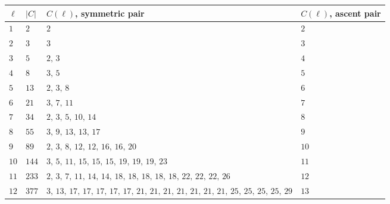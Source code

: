 \begin{tabular}{llll}
\toprule
$\ell$ & $|C|$ & $C(\ell)$, symmetric pair & $C(\ell)$, ascent pair \\
\midrule
$1$ & $2$ & $2$ & $2$ \\
$2$ & $3$ & $3$ & $3$ \\
$3$ & $5$ & $2,\,3$ & $4$ \\
$4$ & $8$ & $3,\,5$ & $5$ \\
$5$ & $13$ & $2,\,3,\,8$ & $6$ \\
$6$ & $21$ & $3,\,7,\,11$ & $7$ \\
$7$ & $34$ & $2,\,3,\,5,\,10,\,14$ & $8$ \\
$8$ & $55$ & $3,\,9,\,13,\,13,\,17$ & $9$ \\
$9$ & $89$ & $2,\,3,\,8,\,12,\,12,\,16,\,16,\,20$ & $10$ \\
$10$ & $144$ & $3,\,5,\,11,\,15,\,15,\,15,\,19,\,19,\,19,\,23$ & $11$ \\
$11$ & $233$ & $2,\,3,\,7,\,11,\,14,\,14,\,18,\,18,\,18,\,18,\,18,\,22,\,22,\,22,\,26$ & $12$ \\
$12$ & $377$ & $3,\,13,\,17,\,17,\,17,\,17,\,17,\,21,\,21,\,21,\,21,\,21,\,21,\,21,\,25,\,25,\,25,\,25,\,29$ & $13$ \\
\bottomrule
\end{tabular}
